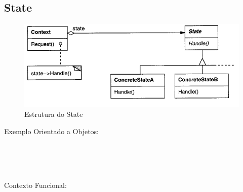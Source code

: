 \subsection{State}

\begin{figure}[htb]
	\caption{\label{fig_grafico}Estrutura do State}
	\begin{center}
	    \includegraphics[scale=0.5]{5_padroes-contexto-funcional/5.3_comportamentais/5.3.08_state/diagram.png}
	\end{center}
\end{figure}

Exemplo Orientado a Objetos:

\begin{lstlisting}[caption={State Orientação a Objetos},label=oostate]


    
\end{lstlisting}

Contexto Funcional:


\begin{lstlisting}[caption={State Funcional},label=fpstate]
    

    
\end{lstlisting}